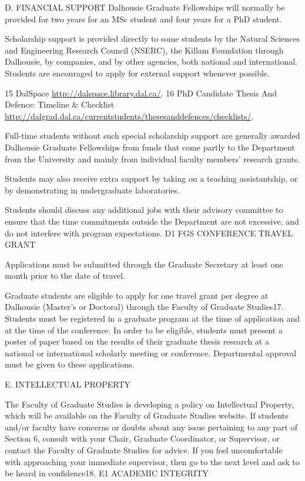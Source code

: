 \documentclass{article}
\newcommand\elink[1]{\url{#1}}
\begin{document}
D.	FINANCIAL  SUPPORT
Dalhousie Graduate Fellowships will normally be provided for two years for an MSc student and four years for a PhD student.

Scholarship support is provided directly to some students by the Natural Sciences and Engineering Research Council (NSERC), the Killam Foundation through Dalhousie, by companies, and by other agencies, both national and international. Students are encouraged to apply for external support whenever possible.


15 DalSpace \elink{http://dalspace.library.dal.ca/}.
16 PhD Candidate Thesis And Defence: Timeline \& Checklist \elink{http://dalgrad.dal.ca/currentstudents/thesesanddefences/checklists/}.
 

Full-time students without such special scholarship support are generally awarded Dalhousie Graduate Fellowships from funds that come partly to the Department from the University and mainly from individual faculty members’ research grants.

Students may also receive extra support by taking on a teaching assistantship, or by demonstrating in undergraduate laboratories.

Students should discuss any additional jobs with their advisory committee to ensure that the time commitments outside the Department are not excessive, and do not interfere with program expectations.
D1	FGS CONFERENCE TRAVEL GRANT

Applications must be submitted through the Graduate Secretary at least one month prior to the date of travel.

Graduate students are eligible to apply for one travel grant per degree at Dalhousie (Master’s or Doctoral) through the Faculty of Graduate Studies17. Students must be registered in a graduate program at the time of application and at the time of the conference. In order to be eligible, students must present a poster of paper based on the results of their graduate thesis research at a national or international scholarly meeting or conference. Departmental approval must be given to these applications.


E.	INTELLECTUAL  PROPERTY

The Faculty of Graduate Studies is developing a policy on Intellectual Property, which will be available on the Faculty of Graduate Studies website.
If students and/or faculty have concerns or doubts about any issue pertaining to any part of Section 6, consult with your Chair, Graduate Coordinator, or Supervisor, or contact the Faculty of Graduate Studies for advice. If you feel uncomfortable with approaching your immediate supervisor, then go to the next level and ask to be heard in confidence18.
E1	ACADEMIC INTEGRITY
\end{document}
